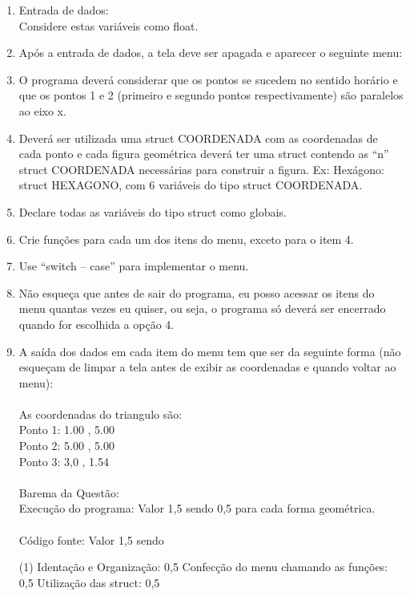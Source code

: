 \documentclass[12pt,a4paper]{article}
\begin{document}
\begin{enumerate}[label=\arabic*]
\item Entrada de dados:\\
\noindent{}
Considere estas variáveis como float.
\item Após a entrada de dados, a tela deve ser apagada e aparecer o seguinte menu:
\noindent{}
\item O programa deverá considerar que os pontos se sucedem no sentido horário e que os pontos 1 e 2 (primeiro e segundo pontos respectivamente) são paralelos ao eixo x.
\item Deverá ser utilizada uma struct COORDENADA com as coordenadas de cada ponto e cada figura geométrica deverá ter uma struct contendo as “n” struct COORDENADA necessárias para construir a figura. Ex: Hexágono: struct HEXAGONO, com 6 variáveis do tipo struct COORDENADA.
\item Declare todas as variáveis do tipo struct como globais.
\item Crie funções para cada um dos itens do menu, exceto para o item 4.
\item Use “switch – case” para implementar o menu.
\item Não esqueça que antes de sair do programa, eu posso acessar os itens do menu quantas vezes eu quiser, ou seja, o programa só deverá ser encerrado quando for escolhida a opção 4.
\item A saída dos dados em cada item do menu tem que ser da seguinte forma (não esqueçam de limpar a tela antes de exibir as coordenadas e quando voltar ao menu):\\
\\
As coordenadas do triangulo são:\\
Ponto 1: 1.00 , 5.00\\
Ponto 2: 5.00 , 5.00\\
Ponto 3: 3,0 , 1.54\\
\\
Barema da Questão:\\
Execução do programa: Valor 1,5 sendo 0,5 para cada forma geométrica.\\
\\
Código fonte: Valor 1,5 sendo
\begin{tasks}(1)
\task Identação e Organização: 0,5
\task Confecção do menu chamando as funções: 0,5
\task Utilização das struct: 0,5
\end{tasks}
\end{enumerate}
\end{document}
